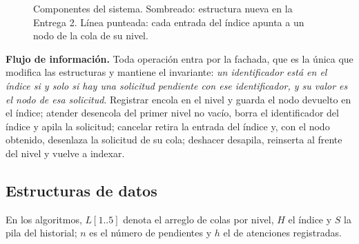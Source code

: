 \begin{figure}[t]
  \centering
  \caption{Componentes del sistema. Sombreado: estructura nueva en la
  Entrega 2. Línea punteada: cada entrada del índice apunta a un nodo de
  la cola de su nivel.}
  \label{fig:arquitectura}
\end{figure}

\textbf{Flujo de información.} Toda operación entra por la fachada, que es
la única que modifica las estructuras y mantiene el invariante: \emph{un
identificador está en el índice si y solo si hay una solicitud pendiente
con ese identificador, y su valor es el nodo de esa solicitud}. Registrar
encola en el nivel y guarda el nodo devuelto en el índice; atender
desencola del primer nivel no vacío, borra el identificador del índice y
apila la solicitud; cancelar retira la entrada del índice y, con el nodo
obtenido, desenlaza la solicitud de su cola; deshacer desapila, reinserta
al frente del nivel y vuelve a indexar.

\subsection{Estructuras de datos}

En los algoritmos, $L[1..5]$ denota el arreglo de colas por nivel, $H$ el
índice y $S$ la pila del historial; $n$ es el número de pendientes y $h$ el
de atenciones registradas.

